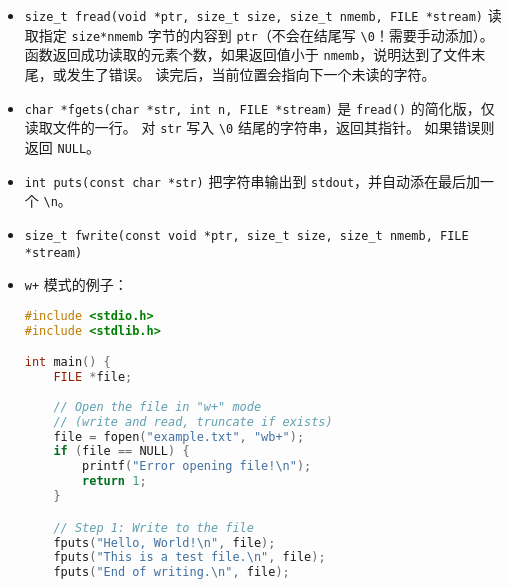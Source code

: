 \begin{itemize}
\begin{lstlisting}[language=cpp]
    // Move the file pointer to the start index
    fseek(file, start_ind, SEEK_SET);

    // Read the bytes from start_ind
    size_t bytesRead = fread(buffer, sizeof(char), length, file);

    // Null-terminate the buffer if any data was read
    if (bytesRead > 0)
        buffer[bytesRead] = '\0';

    if (bytesRead != length) {
        // Check if we reached EOF
        if (feof(file))
            printf("End of file reached.\n");
        // Check for read errors
        else if (ferror(file))
            perror("Error reading file");
    }

    // Print the string
    printf("Read string: %s\n", buffer);

    // Write to middle of file
    fseek(file, start_ind, SEEK_SET);
    size_t bytesWritten = fwrite("abcde", sizeof(char), 5, file);

    // Free the allocated memory and close the file
    free(buffer);
    fclose(file);

    return 0;
}
\end{lstlisting}
\item \verb`size_t fread(void *ptr, size_t size, size_t nmemb, FILE *stream)` 读取指定 \verb`size*nmemb` 字节的内容到 \verb`ptr`（不会在结尾写 \verb`\0`！需要手动添加）。 函数返回成功读取的元素个数，如果返回值小于 \verb`nmemb`，说明达到了文件末尾，或发生了错误。 读完后，当前位置会指向下一个未读的字符。
\item \verb`char *fgets(char *str, int n, FILE *stream)` 是 \verb`fread()` 的简化版，仅读取文件的一行。 对 \verb`str` 写入 \verb`\0` 结尾的字符串，返回其指针。 如果错误则返回 \verb`NULL`。
\item \verb`int puts(const char *str)` 把字符串输出到 \verb`stdout`，并自动添在最后加一个 \verb`\n`。
\item \verb`size_t fwrite(const void *ptr, size_t size, size_t nmemb, FILE *stream)`
\item \verb`w+` 模式的例子：
\begin{lstlisting}[language=cpp]
#include <stdio.h>
#include <stdlib.h>

int main() {
    FILE *file;
    
    // Open the file in "w+" mode
    // (write and read, truncate if exists)
    file = fopen("example.txt", "wb+");
    if (file == NULL) {
        printf("Error opening file!\n");
        return 1;
    }

    // Step 1: Write to the file
    fputs("Hello, World!\n", file);
    fputs("This is a test file.\n", file);
    fputs("End of writing.\n", file);


\end{lstlisting}
\end{itemize}
